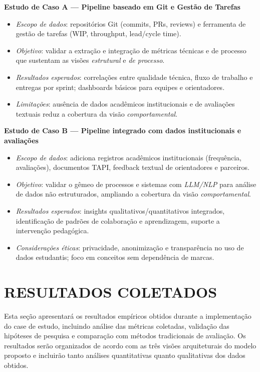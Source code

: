 \documentclass[12pt,a4paper]{article}
\begin{document}
\textbf{Estudo de Caso A — Pipeline baseado em Git e Gestão de Tarefas}
\begin{itemize}
  \item \textit{Escopo de dados}: repositórios Git (commits, PRs, reviews) e ferramenta de gestão de tarefas (WIP, throughput, lead/cycle time).
  \item \textit{Objetivo}: validar a extração e integração de métricas técnicas e de processo que sustentam as visões \textit{estrutural} e \textit{de processo}.
  \item \textit{Resultados esperados}: correlações entre qualidade técnica, fluxo de trabalho e entregas por sprint; dashboards básicos para equipes e orientadores.
  \item \textit{Limitações}: ausência de dados acadêmicos institucionais e de avaliações textuais reduz a cobertura da visão \textit{comportamental}.
\end{itemize}

\textbf{Estudo de Caso B — Pipeline integrado com dados institucionais e avaliações}
\begin{itemize}
  \item \textit{Escopo de dados}: adiciona registros acadêmicos institucionais (frequência, avaliações), documentos TAPI, feedback textual de orientadores e parceiros.
  \item \textit{Objetivo}: validar o gêmeo de processos e sistemas com \textit{LLM/NLP} para análise de dados não estruturados, ampliando a cobertura da visão \textit{comportamental}.
  \item \textit{Resultados esperados}: insights qualitativos/quantitativos integrados, identificação de padrões de colaboração e aprendizagem, suporte a intervenção pedagógica.
  \item \textit{Considerações éticas}: privacidade, anonimização e transparência no uso de dados estudantis; foco em conceitos sem dependência de marcas.
\end{itemize}

\section{RESULTADOS COLETADOS}

Esta seção apresentará os resultados empíricos obtidos durante a implementação
do case de estudo, incluindo análise das métricas coletadas, validação das
hipóteses de pesquisa e comparação com métodos tradicionais de avaliação. Os
resultados serão organizados de acordo com as três visões arquiteturais do
modelo proposto e incluirão tanto análises quantitativas quanto qualitativas
dos dados obtidos.
\end{document}
